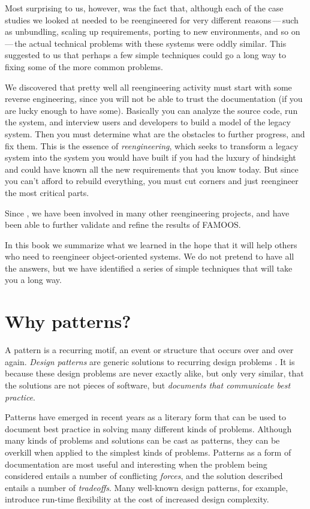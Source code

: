 \documentclass[a4paper,10pt,twoside]{book}
\begin{document}
Most surprising to us, however, was the fact that, although each of the case studies we looked at needed to be reengineered for very different reasons\,---\,such as unbundling, scaling up requirements, porting to new environments, and so on\,---\,the actual technical problems with these systems were oddly similar. This suggested to us that perhaps a few simple techniques could go a long way to fixing some of the more common problems.

We discovered that pretty well all reengineering activity must start with some reverse engineering, since you will not be able to trust the documentation (if you are lucky enough to have some). Basically you can analyze the source code, run the system, and interview users and developers to build a model of the legacy system. Then you must determine what are the obstacles to further progress, and fix them. This is the essence of \emph{reengineering}, which seeks to transform a legacy system into the system you would have built if you had the luxury of hindsight and could have known all the new requirements that you know today. But since you can't afford to rebuild everything, you must cut corners and just reengineer the most critical parts.

Since , we have been involved in many other reengineering projects, and have been able to further validate and refine the results of FAMOOS.

In this book we summarize what we learned in the hope that it will help others who need to reengineer object-oriented systems. We do not pretend to have all the answers, but we have identified a series of simple techniques that will take you a long way.

\section*{Why patterns?}

A pattern is a recurring motif, an event or structure that occurs over and over again. \emph{Design patterns} are generic solutions to recurring design problems \cite{Gamm95a}. It is because these design problems are never exactly alike, but only very similar, that the solutions are not pieces of software, but \emph{documents that communicate best practice}.

Patterns have emerged in recent years as a literary form that can be used to document best practice in solving many different kinds of problems. Although many kinds of problems and solutions can be cast as patterns, they can be overkill when applied to the simplest kinds of problems. Patterns as a form of documentation are most useful and interesting when the problem being considered entails a number of conflicting \emph{forces}, and the solution described entails a number of \emph{tradeoffs}. Many well-known design patterns, for example, introduce run-time flexibility at the cost of increased design complexity.
\end{document}

